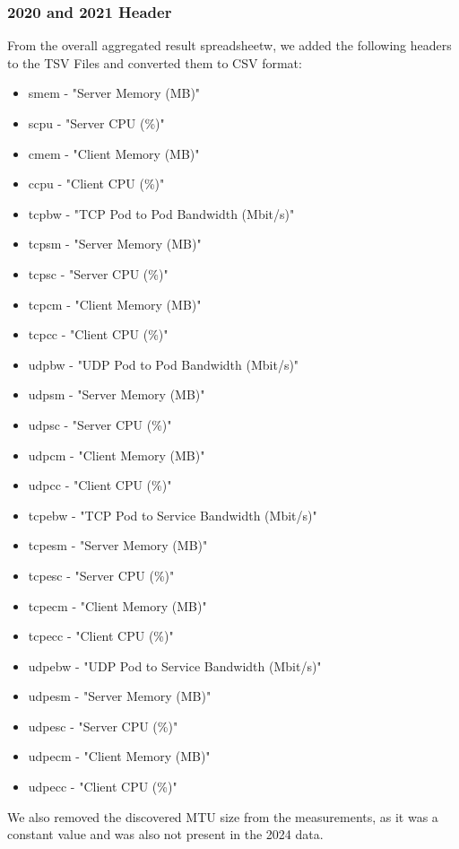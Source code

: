 \subsubsection{2020 and 2021 Header}

From the overall aggregated result spreadsheetw, we added the following headers to the TSV Files and converted them to CSV format:

\begin{itemize}
    \item smem - "Server Memory (MB)"
    \item scpu - "Server CPU (\%)"
    \item cmem - "Client Memory (MB)"
    \item ccpu - "Client CPU (\%)"
    \item tcpbw - "TCP Pod to Pod Bandwidth (Mbit/s)"
    \item tcpsm - "Server Memory (MB)"
    \item tcpsc - "Server CPU (\%)"
    \item tcpcm - "Client Memory (MB)"
    \item tcpcc - "Client CPU (\%)"
    \item udpbw - "UDP Pod to Pod Bandwidth (Mbit/s)"
    \item udpsm - "Server Memory (MB)"
    \item udpsc - "Server CPU (\%)"
    \item udpcm - "Client Memory (MB)"
    \item udpcc - "Client CPU (\%)"
    \item tcpebw - "TCP Pod to Service Bandwidth (Mbit/s)"
    \item tcpesm - "Server Memory (MB)"
    \item tcpesc - "Server CPU (\%)"
    \item tcpecm - "Client Memory (MB)"
    \item tcpecc - "Client CPU (\%)"
    \item udpebw - "UDP Pod to Service Bandwidth (Mbit/s)"
    \item udpesm - "Server Memory (MB)"
    \item udpesc - "Server CPU (\%)"
    \item udpecm - "Client Memory (MB)"
    \item udpecc - "Client CPU (\%)"
\end{itemize}

We also removed the discovered MTU size from the measurements, as it was a constant value and was also not present in the 2024 data.

